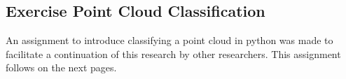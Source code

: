 \subsection{Exercise Point Cloud Classification}
An assignment to introduce classifying a point cloud in python was made to facilitate a continuation of this research by other researchers. This assignment follows on the next pages.
